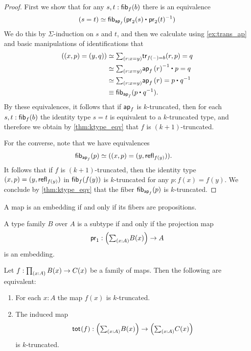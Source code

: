 \begin{proof}
First we show that for any $s,t:\mathsf{fib}_{f}(b)$ there is an equivalence
\begin{equation*}
\eqv{(s=t)}{\fib{\apfunc{f}}{\ct{\proj 2(s)}{\proj 2(t)^{-1}}}}
\end{equation*}
We do this by $\Sigma$-induction on $s$ and $t$, and then we calculate using \cref{ex:trans_ap} and basic manipulations of identifications that
\begin{align*}
(\pairr{x,p}=\pairr{y,q}) & \eqvsym \sm{r:x=y} \mathsf{tr}_{f(\blank)=b}(r,p)=q \\
& \eqvsym \sm{r:x=y} \ct{\ap{f}{r}^{-1}}{p}=q \\
& \eqvsym \sm{r:x=y} \ap{f}{r}=\ct{p}{q^{-1}} \\
& \jdeq \fib{\apfunc{f}}{\ct{p}{q^{-1}}}.
\end{align*}
By these equivalences, it follows that if $\mathsf{ap}_{f}$ is $k$-truncated, then for each $s,t:\mathsf{fib}_{f}(b)$ the identity type $s=t$ is equivalent to a $k$-truncated type, and therefore we obtain by \cref{thm:ktype_eqv} that $f$ is $(k+1)$-truncated.

For the converse, note that we have equivalences
\begin{align*}
\mathsf{fib}_{\mathsf{ap}_{f}}(p) & \simeq ((x,p)=(y,\mathsf{refl}_{f(y)})).
\end{align*}
It follows that if $f$ is $(k+1)$-truncated, then the identity type $(x,p)=(y,\mathsf{refl}_{f(y)})$ in $\mathsf{fib}_{f}(f(y))$ is $k$-truncated for any $p:f(x)=f(y)$. We conclude by \cref{thm:ktype_eqv} that the fiber $\mathsf{fib}_{\mathsf{ap}_{f}}(p)$ is $k$-truncated. 
\end{proof}

\begin{cor}\label{cor:prop_emb}
A map is an embedding if and only if its fibers are propositions.
\end{cor}

\begin{cor}\label{thm:subtype}
A type family $B$ over $A$ is a subtype if and only if the projection map
\begin{equation*}
\proj 1 : \Big(\sm{x:A}B(x)\Big)\to A
\end{equation*}
is an embedding.
\end{cor}

\begin{thm}
Let $f:\prd{x:A}B(x)\to C(x)$ be a family of maps. Then the following are equivalent:
\begin{enumerate}
\item For each $x:A$ the map $f(x)$ is $k$-truncated.
\item The induced map 
\begin{equation*}
\total{f}:\Big(\sm{x:A}B(x)\Big)\to\Big(\sm{x:A}C(x)\Big)
\end{equation*}
is $k$-truncated.
\end{enumerate}
\end{thm}

